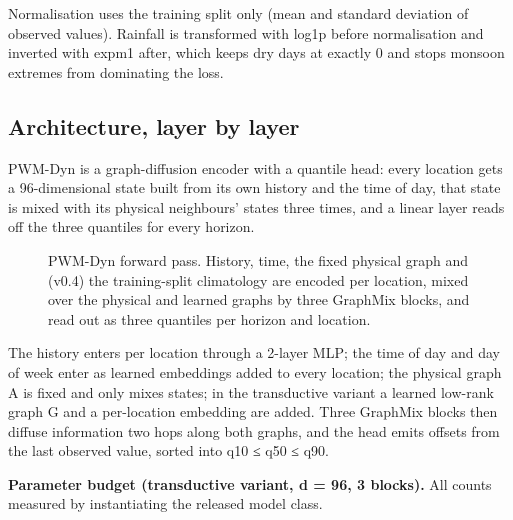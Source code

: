 \documentclass[
  10pt,
]{article}
\begin{document}
Normalisation uses the training split only (mean and standard deviation
of observed values). Rainfall is transformed with log1p before
normalisation and inverted with expm1 after, which keeps dry days at
exactly 0 and stops monsoon extremes from dominating the loss.

\subsection{Architecture, layer by layer}

PWM-Dyn is a graph-diffusion encoder with a quantile head: every
location gets a 96-dimensional state built from its own history and the
time of day, that state is mixed with its physical neighbours' states
three times, and a linear layer reads off the three quantiles for every
horizon.

\begin{figure}[t]
\centering
\resizebox{\textwidth}{!}{}
\caption{PWM-Dyn forward pass. History, time, the fixed physical graph and (v0.4) the training-split climatology are encoded per location, mixed over the physical and learned graphs by three GraphMix blocks, and read out as three quantiles per horizon and location.}
\label{fig:arch}
\end{figure}

The history enters per location through a 2-layer MLP; the time of day
and day of week enter as learned embeddings added to every location; the
physical graph A is fixed and only mixes states; in the transductive
variant a learned low-rank graph G and a per-location embedding are
added. Three GraphMix blocks then diffuse information two hops along
both graphs, and the head emits offsets from the last observed value,
sorted into q10 ≤ q50 ≤ q90.

\textbf{Parameter budget (transductive variant, d = 96, 3 blocks).} All
counts measured by instantiating the released model class.
\end{document}
